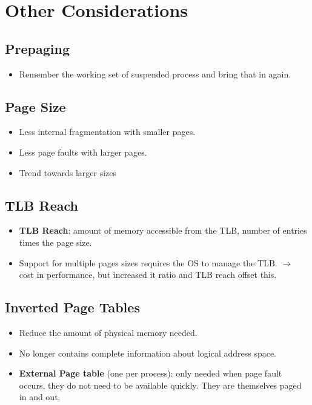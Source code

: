 \documentclass[10pt]{report}
\begin{document}
	\section{Other Considerations}
		\subsection{Prepaging}
			\begin{itemize}
				\item Remember the working set of suspended process and bring that in again.
			\end{itemize}

		\subsection{Page Size}
			\begin{itemize}
				\item Less internal fragmentation with smaller pages.
				\item Less page faults with larger pages.
				\item Trend towards larger sizes
			\end{itemize}

		\subsection{TLB Reach}
			\begin{itemize}
				\item \textbf{TLB Reach}: amount of memory accessible from the TLB, number of entries times the page size.
				\item Support for multiple pages sizes requires the OS to manage the TLB. $\rightarrow$ cost in performance, but increased it ratio and TLB reach offset this.
			\end{itemize}

		\subsection{Inverted Page Tables}
			\begin{itemize}
				\item Reduce the amount of physical memory needed.
				\item No longer contains complete information about logical address space.
				\item \textbf{External Page table} (one per process): only needed when page fault occurs, they do not need to be available quickly. They are themselves paged in and out.
			\end{itemize}
\end{document}
